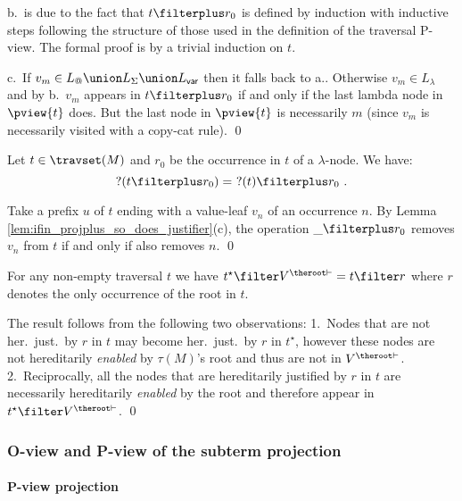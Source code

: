 b.\ is due to the fact that $t\filterplus r_0$ is defined by
induction with inductive steps following the structure of those used
in the definition of the traversal P-view. The formal proof is by a
trivial induction on $t$.

c.\ If $v_m \in L_@ \union L_\Sigma \union L_{\sf var}$ then it
falls back to a.. Otherwise $v_m \in L_\lambda$ and by b.\, $v_m$
appears in $t\filterplus r_0$ if and only if the last lambda node in
$\pview{t}$ does. But the last node in $\pview{t}$ is necessarily
$m$ (since $v_m$ is necessarily visited with a copy-cat rule). \qed
\smallskip


\begin{lemma}
\label{lem:projplus_pendingnode}
 Let $t \in \travset(M)$ and $r_0$ be the occurrence in $t$ of a $\lambda$-node.
 We have:
  $$?(t\filterplus r_0) =\ ?(t) \filterplus r_0 \ .$$
\end{lemma}
\proof Take a prefix $u$ of $t$ ending with a value-leaf $v_n$ of an
occurrence $n$. By Lemma
\ref{lem:ifin_projplus_so_does_justifier}(c), the operation $\_
\filterplus r_0$ removes $v_n$ from $t$ if and only if also removes
$n$. \qed
\smallskip

\begin{lemma}
\label{lem:he_proj_root_is_hj_proj_r} For any non-empty traversal
$t$ we have  $t^\star\filter V^{\theroot\vdash} = t \filter r$ where
$r$ denotes the only occurrence of the root in $t$.
\end{lemma}
\proof The result follows from the following two observations: 1.\
Nodes that are not her.\ just.\ by $r$ in $t$ may become her.\
just.\ by $r$ in $t^\star$, however these nodes are not hereditarily
\emph{enabled}
 by $\tau(M)$'s root and thus are not in $V^{\theroot\vdash}$.
2.\ Reciprocally, all the nodes that are hereditarily justified by
$r$ in $t$ are necessarily hereditarily \emph{enabled} by the root
and therefore appear in $t^\star \filter V^{\theroot\vdash}$. \qed


\subsubsection{O-view and P-view of the subterm projection}

\paragraph{P-view projection}


